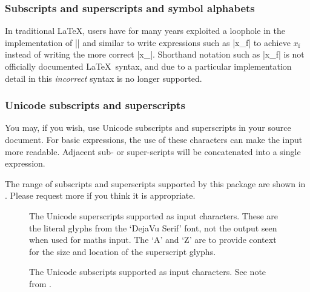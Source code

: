 \subsubsection{Subscripts and superscripts and symbol alphabets}

In traditional \LaTeX, users have for many years exploited a loophole in the implementation
of |\mathrm| and similar to write expressions such as |x_\mathrm f| to achieve
$x_{\mathrm{f}}$ instead of writing the more correct |x_{}|.
Shorthand notation such as |x_\mathrm f| is not officially documented \LaTeX\ syntax,
and due to a particular implementation detail in  this \emph{incorrect}
syntax is no longer supported.


\subsubsection{Unicode subscripts and superscripts}

You may, if you wish, use Unicode subscripts and superscripts in your
source document. For basic expressions, the use of these characters
can make the input more readable.
Adjacent sub- or super-scripts will be concatenated into a single
expression.

The range of subscripts and superscripts supported by this package
are shown in . Please request more if
you think it is appropriate.

\begin{figure}\centering
{}
\caption{
  The Unicode superscripts supported as input characters.
  These are the literal glyphs from the `DejaVu Serif' font,
  not the output seen when used for maths input.
  The `A' and `Z' are to provide context for the size and
  location of the superscript glyphs.
}
\end{figure}

\begin{figure}\centering
{}
\caption{
  The Unicode subscripts supported as input characters.
  See note from .
}
\end{figure}

